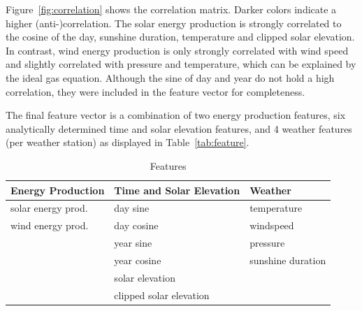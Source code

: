 \documentclass[11pt,table]{article}
\begin{document}
Figure~\ref{fig:correlation} shows the correlation matrix. Darker colors indicate a higher (anti-)correlation. The solar energy production is strongly correlated to the cosine of the day, sunshine duration, temperature and clipped solar elevation. In contrast, wind energy production is only strongly correlated with wind speed and slightly correlated with pressure and temperature, which can be explained by the ideal gas equation. Although the sine of day and year do not hold a high correlation, they were included in the feature vector for completeness.

The final feature vector is a combination of two energy production features, six analytically determined time and solar elevation features, and 4 weather features (per weather station) as displayed in Table~\ref{tab:feature}.

\begin{table}[]
\begin{center}
\begin{tabular}{p{4.5cm}|p{5cm}|p{4.5cm}}
\toprule
\textbf{Energy Production} & \textbf{Time and Solar Elevation} & \textbf{Weather}              \\
\midrule
solar energy prod. & day sine                 & temperature          \\
wind energy prod.  & day cosine               & windspeed            \\
                   & year sine                & pressure             \\
                   & year cosine              & sunshine duration    \\
                   & solar elevation          &                      \\
                   & clipped solar elevation  &                     \\ \bottomrule
\end{tabular}
\end{center}
\caption{Features}
\label{tab:features}
\end{table}
\end{document}
